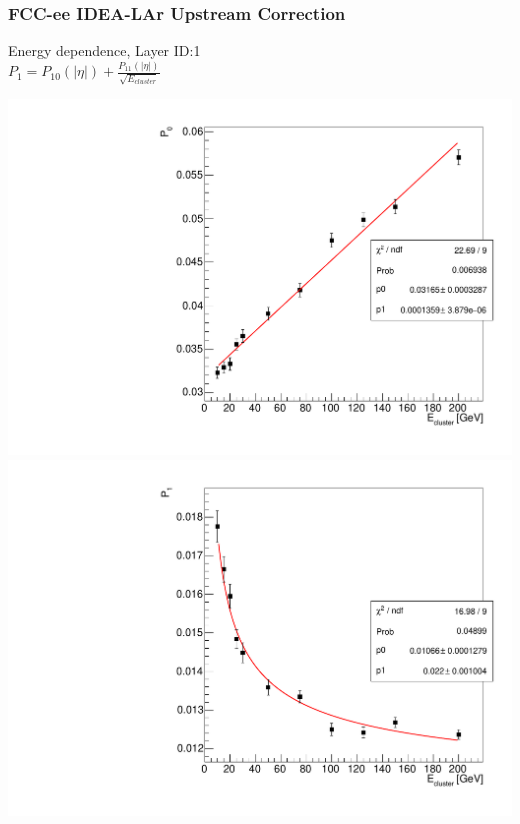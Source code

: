 \documentclass{beamer}
\newcommand{\redtext}[1]{%
  \textcolor{myRed}{#1}
}
\begin{document}
\begin{frame}
  \frametitle{FCC-ee IDEA-LAr Upstream Correction}

  \begin{center}
    Energy dependence, Layer \redtext{ID:\@ 1} \\
    $ P_1 = P_{10}(|\eta|) + \frac{P_{11}(|\eta|)}{\sqrt{E_{cluster}}} $
  \end{center}

  \includegraphics[width=0.49\linewidth]{figures/momentum_id1/graph_upstream_corr_param0.pdf}
  \includegraphics[width=0.49\linewidth]{figures/momentum_id1/graph_upstream_corr_param1.pdf}
\end{frame}
\end{document}
